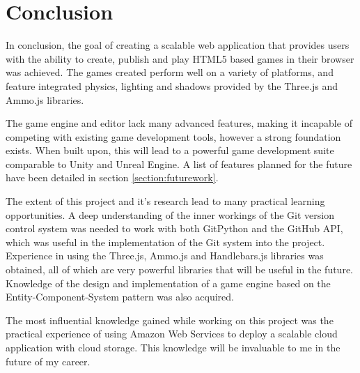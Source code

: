 \chapter{Conclusion}

In conclusion, the goal of creating a scalable web application that provides users with the ability to create, publish and play HTML5 based games in their browser was achieved. The games created perform well on a variety of platforms, and feature integrated physics, lighting and shadows provided by the Three.js and Ammo.js libraries.

The game engine and editor lack many advanced features, making it incapable of competing with existing game development tools, however a strong foundation exists. When built upon, this will lead to a powerful game development suite comparable to Unity and Unreal Engine. A list of features planned for the future have been detailed in section \ref{section:futurework}.

The extent of this project and it's research lead to many practical learning opportunities. A deep understanding of the inner workings of the Git version control system was needed to work with both GitPython and the GitHub API, which was useful in the implementation of the Git system into the project. Experience in using the Three.js, Ammo.js and Handlebars.js libraries was obtained, all of which are very powerful libraries that will be useful in the future. Knowledge of the design and implementation of a game engine based on the Entity-Component-System pattern was also acquired.

The most influential knowledge gained while working on this project was the practical experience of using Amazon Web Services to deploy a scalable cloud application with cloud storage. This knowledge will be invaluable to me in the future of my career.
